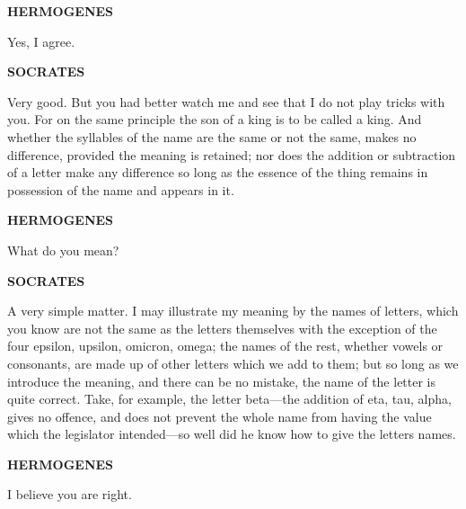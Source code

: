 \documentclass[11pt,letter]{article}
\begin{document}
\par \textbf{HERMOGENES}
\par   Yes, I agree.

\par \textbf{SOCRATES}
\par   Very good. But you had better watch me and see that I do not play tricks with you. For on the same principle the son of a king is to be called a king. And whether the syllables of the name are the same or not the same, makes no difference, provided the meaning is retained; nor does the addition or subtraction of a letter make any difference so long as the essence of the thing remains in possession of the name and appears in it.

\par \textbf{HERMOGENES}
\par   What do you mean?

\par \textbf{SOCRATES}
\par   A very simple matter. I may illustrate my meaning by the names of letters, which you know are not the same as the letters themselves with the exception of the four epsilon, upsilon, omicron, omega; the names of the rest, whether vowels or consonants, are made up of other letters which we add to them; but so long as we introduce the meaning, and there can be no mistake, the name of the letter is quite correct. Take, for example, the letter beta—the addition of eta, tau, alpha, gives no offence, and does not prevent the whole name from having the value which the legislator intended—so well did he know how to give the letters names.

\par \textbf{HERMOGENES}
\par   I believe you are right.
\end{document}
